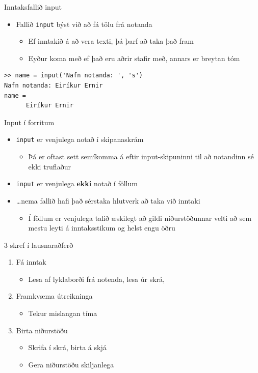 \documentclass{beamer}
\begin{document}
\begin{frame}[fragile]{Inntaksfallið input}
\begin{itemize}
 \item Fallið \texttt{input} býst við að fá tölu frá notanda
 \begin{itemize}
  \item Ef inntakið á að vera texti, þá þarf að taka það fram
  \item Eyður koma með ef það eru aðrir stafir með, annars er breytan tóm
 \end{itemize}
\end{itemize}

\begin{verbatim}
>> name = input('Nafn notanda: ', 's')
Nafn notanda: Eiríkur Ernir
name = 
      Eiríkur Ernir
\end{verbatim}
\end{frame}

\begin{frame}{Input í forritum}
\begin{itemize}
 \item \texttt{input} er venjulega notað í skipanaskrám
 \begin{itemize}
  \item Þá er oftast sett semíkomma á eftir input-skipuninni til að notandinn sé ekki truflaður
 \end{itemize}
 \item \texttt{input} er venjulega \textbf{ekki} notað í föllum
 \item \ldots nema fallið hafi það sérstaka hlutverk að taka við inntaki
 \begin{itemize}
  \item Í föllum er venjulega talið æskilegt að gildi niðurstöðunnar velti að sem mestu leyti á inntaksstikum og helst engu öðru
 \end{itemize}
\end{itemize}
\end{frame}

\begin{frame}{3 skref í lausnaraðferð}
\begin{enumerate}
 \item Fá inntak
 \begin{itemize}
  \item Lesa af lyklaborði frá notenda, lesa úr skrá, 
 \end{itemize}
 \item Framkvæma útreikninga
 \begin{itemize}
  \item Tekur mislangan tíma
 \end{itemize}
 \item Birta niðurstöðu
 \begin{itemize}
  \item Skrifa í skrá, birta á skjá
  \item Gera niðurstöðu skiljanlega
 \end{itemize}
\end{enumerate}
\end{frame}
\end{document}
